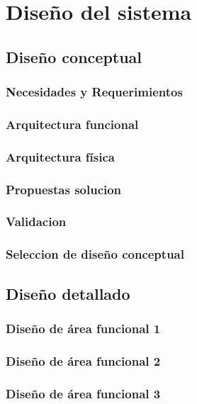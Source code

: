 
\chapter{Diseño del sistema}


\section{Diseño conceptual}

\subsection{Necesidades y Requerimientos}

\subsection{Arquitectura funcional}

\subsection{Arquitectura física}

\subsection{Propuestas solucion}

\subsection{Validacion}

\subsection{Seleccion de diseño conceptual}


\section{Diseño detallado}

\subsection{Diseño de área funcional 1}

\subsection{Diseño de área funcional 2}

\subsection{Diseño de área funcional 3}


\newpage

